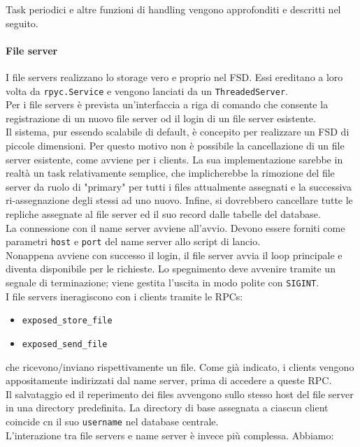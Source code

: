 \documentclass[a4paper, 12pt]{scrreprt}
\begin{document}
            Task periodici e altre funzioni di handling vengono approfonditi e descritti nel seguito.

        \paragraph{File server}

            I file servers realizzano lo storage vero e proprio nel FSD. Essi ereditano a loro volta da \texttt{rpyc.Service} e vengono lanciati da un \texttt{ThreadedServer}.\\
            Per i file servers è prevista un'interfaccia a riga di comando che consente la registrazione di un nuovo file server od il login di un file server esistente.\\
            Il sistema, pur essendo scalabile di default, è concepito per realizzare un FSD di piccole dimensioni. Per questo motivo non è possibile la cancellazione di un file server esistente, come avviene per i clients. La sua implementazione sarebbe in realtà un task relativamente semplice, che implicherebbe la rimozione del file server da ruolo di "primary" per tutti i files attualmente assegnati e la successiva ri-assegnazione degli stessi ad uno nuovo. Infine, si dovrebbero cancellare tutte le repliche assegnate al file server ed il suo record dalle tabelle del database.\\
            La connessione con il name server avviene all'avvio. Devono essere forniti come parametri \texttt{host} e \texttt{port} del name server allo script di lancio.\\
            Nonappena avviene con successo il login, il file server avvia il loop principale e diventa disponibile per le richieste. Lo spegnimento deve avvenire tramite un segnale di terminazione; viene gestita l'uscita in modo polite con \texttt{SIGINT}.\\
            I file servers ineragiscono con i clients tramite le RPCs:

            \begin{itemize}

                \item \texttt{exposed\_store\_file}

                \item \texttt{exposed\_send\_file}

            \end{itemize}

            che ricevono/inviano rispettivamente un file. Come già indicato, i clients vengono appositamente indirizzati dal name server, prima di accedere a queste RPC.\\
            Il salvataggio ed il reperimento dei files avvengono sullo stesso host del file server in una directory predefinita. La directory di base assegnata a ciascun client coincide cn il suo \texttt{username} nel database centrale.\\
            L'interazione tra file servers e name server è invece più complessa. Abbiamo:
\end{document}
